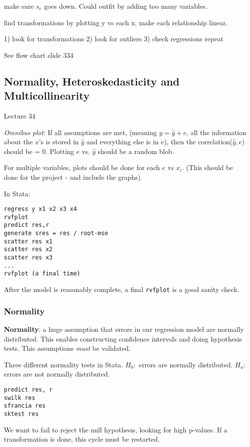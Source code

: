 \documentclass[11pt, oneside]{article}   	%
\begin{document}
make sure $s_e$ goes down. Could outfit by adding too many variables.

find transformations by plotting y vs each x. make each relationship linear.

1) look for transformations 2) look for outliers 3) check regressions repeat

See flow chart slide 334

\subsection{Normality, Heteroskedasticity and Multicollinearity}

Lecture 34

\textit{Omnibus plot}: If all assumptions are met, (meaning $y = \hat{y} + e$, all the information about the $x$'s is stored in $\hat{y}$ and everything else is in $e$), then the correlation($\hat{y},e$) should be = 0. Plotting $e$ vs. $\hat{y}$ should be a random blob.

For multiple variables, plots should be done for each $e$ vs $x_i$. (This should be done for the project - and include the graphs).

In Stata:
\begin{verbatim}
regress y x1 x2 x3 x4
rvfplot
predict res,r
generate sres = res / root-mse
scatter res x1
scatter res x2
scatter res x3
...
rvfplot (a final time)
\end{verbatim} 

After the model is reasonably complete, a final \texttt{rvfplot} is a good sanity check.

\subsubsection{Normality}

\textbf{Normality}: a huge assumption that errors in our regression model are normally distributed. This enables constructing confidence intervals and doing hypothesis tests. This assumptions \textit{must} be validated.

Three different normality tests in Stata. $H_0:$ errors are normally distributed. $H_a:$ errors are not normally distributed.
\begin{verbatim}
predict res, r
swilk res
sfrancia res
sktest res
\end{verbatim}

We want to fail to reject the null hypothesis, looking for high p-values. If a transformation is done, this cycle must be restarted.
\end{document}
